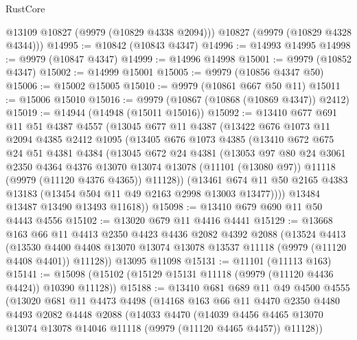 \begin{lexlean}{RustCore}
\begin{coremodule}
        @13109
        @10827
        (@9979 (@10829 @4338 @2094)))
      @10827
      (@9979 (@10829 @4328 @4344)))
@14995 := @10842 (@10843 @4347)
@14996 := @14993 @14995
@14998 := @9979 (@10847 @4347)
@14999 := @14996 @14998
@15001 := @9979 (@10852 @4347)
@15002 := @14999 @15001
@15005 := @9979 (@10856 @4347 @50)
@15006 := @15002 @15005
@15010 := @9979 (@10861 @667 @50 @11)
@15011 := @15006 @15010
@15016 := @9979 (@10867 (@10868 (@10869 @4347)) @2412)
@15019 := @14944 (@14948 (@15011 @15016))
@15092 := @13410
    @677
    @691
    @11
    @51
    @4387
    @4557
    (@13045
      @677
      @11
      @4387
      (@13422
        @676
        @1073
        @11
        @2094
        @4385
        @2412
        @1095
        (@13405
          @676
          @1073
          @4385
          (@13410
            @672
            @675
            @24
            @51
            @4381
            @4384
            (@13045
              @672
              @24
              @4381
              (@13053
                @97
                @80
                @24
                @3061
                @2350
                @4364
                @4376
                @13070
                @13074
                @13078
                (@11101 (@13080 @97))
                @11118
                (@9979 (@11120 @4376 @4365))
                @11128))
            (@13461
              @674
              @11
              @50
              @2165
              @4383
              @13183
              (@13454 @504 @11 @49 @2163 @2998 @13003 @13477))))
        @13484
        @13487
        @13490
        @13493
        @11618))
@15098 := @13410 @679 @690 @11 @50 @4443 @4556
@15102 := @13020 @679 @11 @4416 @4441
@15129 := @13668
    @163
    @66
    @11
    @4413
    @2350
    @4423
    @4436
    @2082
    @4392
    @2088
    (@13524
      @4413
      (@13530 @4400 @4408 @13070 @13074 @13078 @13537 @11118 (@9979 (@11120 @4408 @4401)) @11128))
    @13095
    @11098
@15131 := @11101 (@11113 @163)
@15141 := @15098 (@15102 (@15129 @15131 @11118 (@9979 (@11120 @4436 @4424)) @10390 @11128))
@15188 := @13410
    @681
    @689
    @11
    @49
    @4500
    @4555
    (@13020
      @681
      @11
      @4473
      @4498
      (@14168
        @163
        @66
        @11
        @4470
        @2350
        @4480
        @4493
        @2082
        @4448
        @2088
        (@14033
          @4470
          (@14039
            @4456
            @4465
            @13070
            @13074
            @13078
            @14046
            @11118
            (@9979 (@11120 @4465 @4457))
            @11128))

\end{coremodule}
\end{lexlean}
